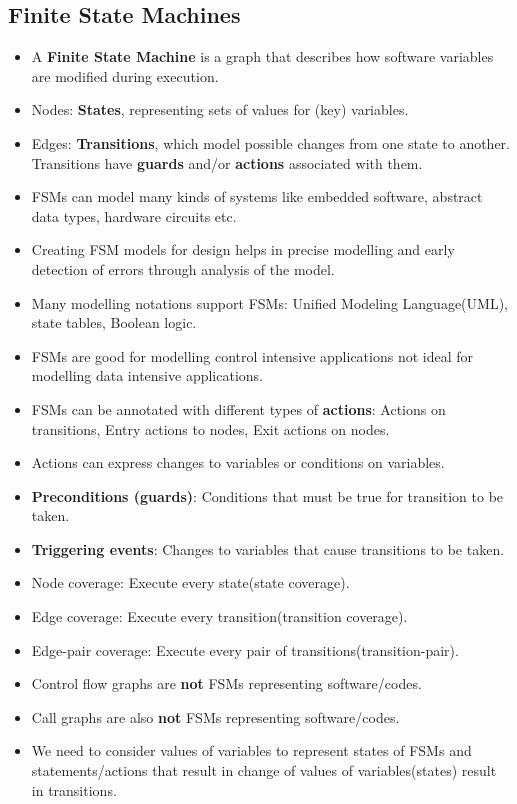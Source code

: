 \documentclass[a4paper]{article}
\begin{document}
\subsection{Finite State Machines}
\begin{itemize}
    \item A \textbf{Finite State Machine} is a graph that describes how software variables are modified during execution.
    \item Nodes: \textbf{States}, representing sets of values for (key) variables.
    \item Edges: \textbf{Transitions}, which model possible changes from one state to another. Transitions have \textbf{guards} and/or \textbf{actions} associated with them.
    \item FSMs can model many kinds of systems like embedded software, abstract data types, hardware circuits etc.
    \item Creating FSM models for design helps in precise modelling and early detection of errors through analysis of the model.
    \item Many modelling notations support FSMs: Unified Modeling Language(UML), state tables, Boolean logic.
    \item FSMs are good for modelling control intensive applications not ideal for modelling data intensive applications.
    \item FSMs can be annotated with different types of \textbf{actions}: Actions on transitions, Entry actions to nodes, Exit actions on nodes.
    \item Actions can express changes to variables or conditions on variables.
    \item \textbf{Preconditions (guards)}: Conditions that must be true for transition to be taken.
    \item \textbf{Triggering events}: Changes to variables that cause transitions to be taken.
    \item Node coverage: Execute every state(state coverage).
    \item Edge coverage: Execute every transition(transition coverage).
    \item Edge-pair coverage: Execute every pair of transitions(transition-pair).
    \item Control flow graphs are \textbf{not} FSMs representing software/codes.
    \item Call graphs are also \textbf{not} FSMs representing software/codes.
    \item We need to consider values of variables to represent states of FSMs and statements/actions that result in change of values of variables(states) result in transitions.
\end{itemize}
\end{document}
